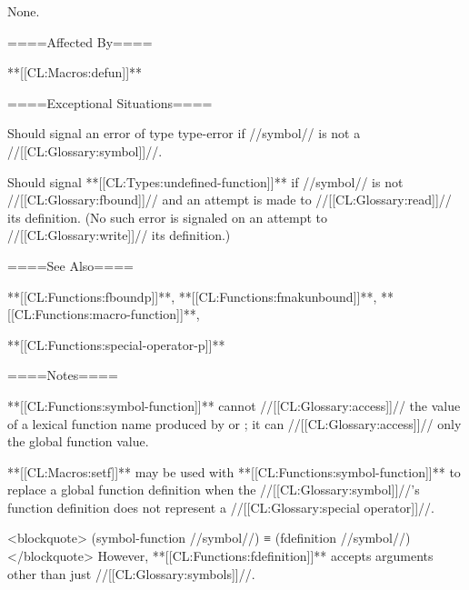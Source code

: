 None.

====Affected By====

**[[CL:Macros:defun]]**

====Exceptional Situations====

Should signal an error of type type-error if //symbol// is not a //[[CL:Glossary:symbol]]//.

Should signal **[[CL:Types:undefined-function]]** if //symbol// is not //[[CL:Glossary:fbound]]// and an attempt is made to //[[CL:Glossary:read]]// its definition. (No such error is signaled on an attempt to //[[CL:Glossary:write]]// its definition.)

====See Also====

**[[CL:Functions:fboundp]]**, **[[CL:Functions:fmakunbound]]**, **[[CL:Functions:macro-function]]**,

**[[CL:Functions:special-operator-p]]**

====Notes====

**[[CL:Functions:symbol-function]]** cannot //[[CL:Glossary:access]]// the value of a lexical function name produced by  or ; it can //[[CL:Glossary:access]]// only the global function value.

**[[CL:Macros:setf]]** may be used with **[[CL:Functions:symbol-function]]** to replace a global function definition when the //[[CL:Glossary:symbol]]//'s function definition does not represent a //[[CL:Glossary:special operator]]//.

<blockquote> (symbol-function //symbol//) ≡ (fdefinition //symbol//) </blockquote> However, **[[CL:Functions:fdefinition]]** accepts arguments other than just //[[CL:Glossary:symbols]]//.

   
